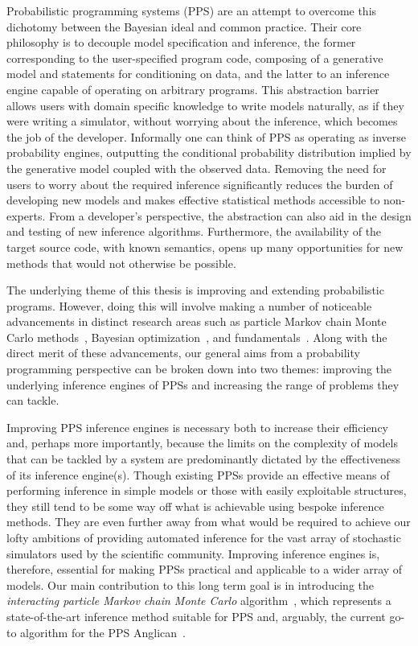 Probabilistic programming systems (PPS) \citep{goodman2008church} are an attempt to
overcome this dichotomy between the Bayesian ideal and common practice.  Their core philosophy 
is to decouple model specification and inference, the former corresponding to the user-specified 
program code, composing of a generative model and statements for conditioning on data, and the 
latter to an inference engine capable of operating on arbitrary programs.  This abstraction barrier 
allows users with domain specific knowledge to write models naturally, as if they were writing a 
simulator, without worrying about the inference, which becomes the job of the developer. Informally 
one can think of PPS as operating as inverse probability engines, outputting the conditional 
probability distribution implied by the generative model coupled with the observed data.
Removing the need for users to worry about the required inference significantly reduces the 
burden of developing new models and makes effective statistical methods accessible to 
non-experts.  From a developer's perspective, the abstraction can also aid in the design 
and testing of new inference algorithms.  Furthermore, the availability of the target source 
code, with known semantics, opens up many opportunities for new methods that would
not otherwise be possible.

The underlying theme of this thesis is improving and extending probabilistic programs.  However,
doing this will involve making a number of noticeable advancements in  distinct research areas such
as particle Markov chain Monte Carlo methods~\citep{andrieu2010particle},
Bayesian optimization~\citep{movckus1975bayesian}, and \mc
fundamentals~\citep{metropolis1949monte}.  Along with the direct merit of
these advancements, our general aims from a probability programming perspective can be
broken down into two themes: improving the underlying inference engines of PPSs and increasing the
range of problems they can tackle.

Improving PPS inference engines is necessary both to increase their efficiency and,
perhaps more importantly, because the limits on the
complexity of models that can be tackled by a system are predominantly dictated by the 
effectiveness of its inference engine(s).  
 Though existing PPSs provide an effective means of performing
inference in simple models or those with easily exploitable structures, they still tend to be
some way off what is achievable using bespoke inference methods.  They are even further away from
what would be required to achieve our lofty ambitions of providing automated inference for
the vast array of stochastic simulators used by the scientific community.  
Improving inference engines is, therefore, essential for making PPSs practical and applicable 
to a wider array of models.
Our main contribution
to this long term goal is in introducing the \emph{interacting particle Markov chain Monte Carlo}
algorithm~\citep{rainforth2016interacting}, which represents a state-of-the-art inference method
suitable for PPS and, arguably, the current go-to algorithm for the PPS Anglican~\citep{wood2014new}.

